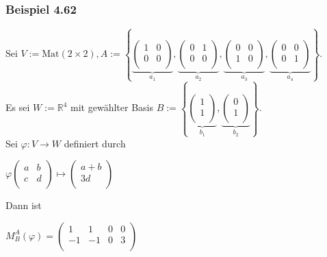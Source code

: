 \documentclass{article}
\begin{document}
\subsubsection*{Beispiel 4.62}
Sei $V := \text{Mat}(2 \times 2), A := \left\{\underbrace{\begin{pmatrix}
    1 & 0 \\
    0 & 0 \\
\end{pmatrix}}_{a_1}, \underbrace{\begin{pmatrix}
    0 & 1 \\
    0 & 0 \\
\end{pmatrix}}_{a_2}, \underbrace{\begin{pmatrix}
    0 & 0 \\
    1 & 0 \\
\end{pmatrix}}_{a_3}, \underbrace{\begin{pmatrix}
    0 & 0 \\
    0 & 1 \\
\end{pmatrix}}_{a_4}\right\}$.\\
Es sei $W := \mathbb{R}^4$ mit gewählter Basis $B := \left\{\underbrace{\begin{pmatrix}
    1 \\
    1 \\
\end{pmatrix}}_{b_1}, \underbrace{\begin{pmatrix}
    0 \\
    1 \\
    \end{pmatrix}}_{b_2}\right\}$. \\
Sei $\varphi: V \rightarrow W$ definiert durch \\
\begin{center}
    $\varphi \begin{pmatrix}
        a & b \\
        c & d \\
    \end{pmatrix} \mapsto \begin{pmatrix}
        a + b \\
        3d \\
    \end{pmatrix}$ \\
\end{center}
Dann ist \\
\begin{center}
$M_B^{A}(\varphi) = \begin{pmatrix}
    1 & 1 & 0 & 0 \\
    -1 & -1 & 0 & 3 \\
\end{pmatrix}$ \\
\end{center}
\end{document}
